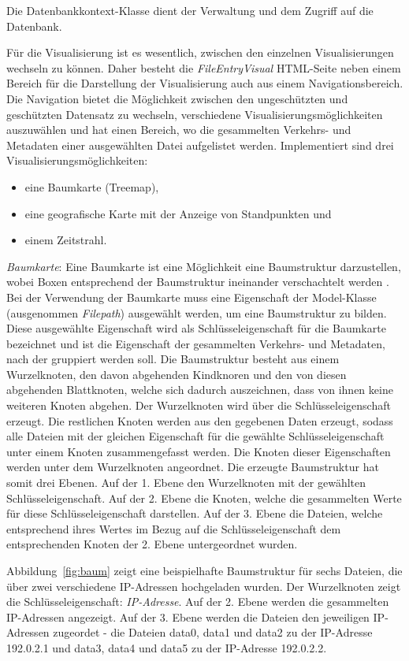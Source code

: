 \documentclass[
    fontsize=12pt,
    headings=small,
    parskip=half,           %
    bibliography=totoc,
    numbers=noenddot,       %
    open=any,               %
    ]{scrreprt}
\begin{document}
Die Datenbankkontext-Klasse dient der Verwaltung und dem Zugriff auf die Datenbank.

Für die Visualisierung ist es wesentlich, zwischen den einzelnen Visualisierungen wechseln zu können.
Daher besteht die \textit{FileEntryVisual} HTML-Seite neben einem Bereich für die Darstellung der Visualisierung auch aus einem Navigationsbereich.
Die Navigation bietet die Möglichkeit zwischen den ungeschützten und geschützten Datensatz zu wechseln, verschiedene Visualisierungsmöglichkeiten auszuwählen und hat einen Bereich, wo die gesammelten Verkehrs- und Metadaten einer ausgewählten Datei aufgelistet werden.
Implementiert sind drei Visualisierungsmöglichkeiten:
\begin{itemize}
\item eine Baumkarte (Treemap),
\item eine geografische Karte mit der Anzeige von Standpunkten und
\item einem Zeitstrahl.
\end{itemize} 

\textit{Baumkarte}: Eine Baumkarte ist eine Möglichkeit eine Baumstruktur darzustellen, wobei Boxen entsprechend der Baumstruktur ineinander verschachtelt werden \cite{treemap}. 
Bei der Verwendung der Baumkarte muss eine Eigenschaft der Model-Klasse (ausgenommen \textit{Filepath}) ausgewählt werden, um eine Baumstruktur zu bilden.
Diese ausgewählte Eigenschaft wird als Schlüsseleigenschaft für die Baumkarte bezeichnet und ist die Eigenschaft der gesammelten Verkehrs- und Metadaten, nach der gruppiert werden soll.
Die Baumstruktur besteht aus einem Wurzelknoten, den davon abgehenden Kindknoren und den von diesen abgehenden Blattknoten, welche sich dadurch auszeichnen, dass von ihnen keine weiteren Knoten abgehen.
Der Wurzelknoten wird über die Schlüsseleigenschaft erzeugt.
Die restlichen Knoten werden aus den gegebenen Daten erzeugt, sodass alle Dateien mit der gleichen Eigenschaft für die gewählte Schlüsseleigenschaft unter einem Knoten zusammengefasst werden.
Die Knoten dieser Eigenschaften werden unter dem Wurzelknoten angeordnet.
Die erzeugte Baumstruktur hat somit drei Ebenen.
Auf der 1. Ebene den Wurzelknoten mit der gewählten Schlüsseleigenschaft.
Auf der 2. Ebene die Knoten, welche die gesammelten Werte für diese Schlüsseleigenschaft darstellen.
Auf der 3. Ebene die Dateien, welche entsprechend ihres Wertes im Bezug auf die Schlüsseleigenschaft dem entsprechenden Knoten der 2. Ebene untergeordnet wurden. 

Abbildung~\ref{fig:baum} zeigt eine beispielhafte Baumstruktur für sechs Dateien, die über zwei verschiedene IP-Adressen hochgeladen wurden. 
Der Wurzelknoten zeigt die Schlüsseleigenschaft: \textit{IP-Adresse}.
Auf der 2. Ebene werden die gesammelten IP-Adressen angezeigt.
Auf der 3. Ebene werden die Dateien den jeweiligen IP-Adressen zugeordet - die Dateien data0, data1 und data2 zu der IP-Adresse 192.0.2.1 und data3, data4 und data5 zu der IP-Adresse 192.0.2.2.
\end{document}
